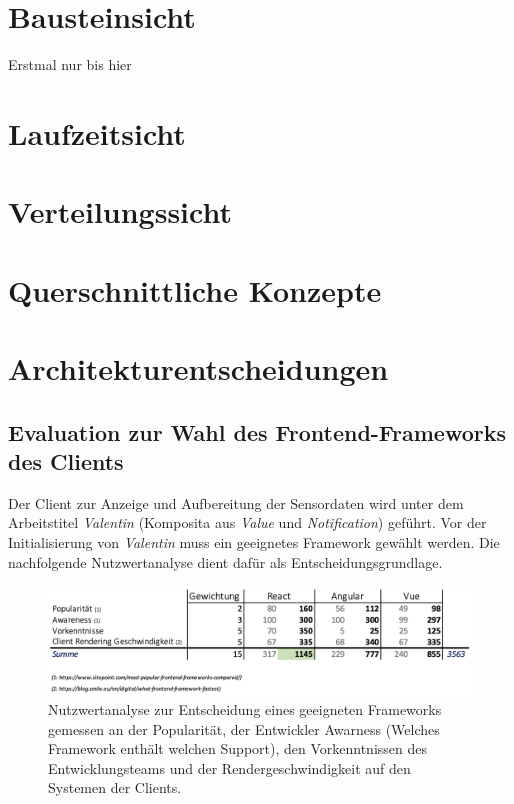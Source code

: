 \documentclass[
]{article}
\begin{document}
\section{Bausteinsicht}
Erstmal nur bis hier

\section{Laufzeitsicht}

\section{Verteilungssicht}

\section{Querschnittliche Konzepte}

\section{Architekturentscheidungen}
\subsection{Evaluation zur Wahl des Frontend-Frameworks des Clients}

Der Client zur Anzeige und Aufbereitung der Sensordaten wird unter dem Arbeitstitel \textit{Valentin} (Komposita aus \textit{Value} und \textit{Notification}) geführt. Vor der Initialisierung von \textit{Valentin} muss ein geeignetes Framework gewählt werden. Die nachfolgende Nutzwertanalyse dient dafür als Entscheidungsgrundlage. 

\begin{figure}
  \centering
  \includegraphics[width=1\textwidth]{./resources/techevaluationfe.png}
  \caption{Nutzwertanalyse zur Entscheidung eines geeigneten Frameworks gemessen an der Popularität, der Entwickler Awarness (Welches Framework enthält welchen Support), den Vorkenntnissen des Entwicklungsteams und der Rendergeschwindigkeit auf den Systemen der Clients.}
  \label{fig:deine_label}
\end{figure}
\end{document}
